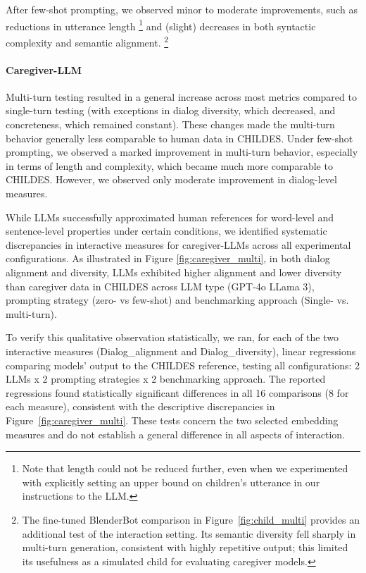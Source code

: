 After few-shot prompting, we observed minor to moderate improvements, such as reductions in utterance length \footnote{Note that length could not be reduced further, even when we experimented with explicitly setting an upper bound on children's utterance in our instructions to the LLM.} and (slight) decreases in both syntactic complexity and semantic alignment. \footnote{The fine-tuned BlenderBot comparison in Figure~\ref{fig:child_multi} provides an additional test of the interaction setting. Its semantic diversity fell sharply in multi-turn generation, consistent with highly repetitive output; this limited its usefulness as a simulated child for evaluating caregiver models.}


\paragraph{Caregiver-LLM} Multi-turn testing resulted in a general increase across most metrics compared to single-turn testing (with exceptions in dialog diversity, which decreased, and concreteness, which remained constant). These changes made the multi-turn behavior generally less comparable to human data in CHILDES. Under few-shot prompting, we observed a marked improvement in multi-turn behavior, especially in terms of length and complexity, which became much more comparable to CHILDES. However, we observed only moderate improvement in dialog-level measures.


While LLMs successfully approximated human references for word-level and sentence-level properties under certain conditions, we identified systematic discrepancies in interactive measures for caregiver-LLMs across all experimental configurations. As illustrated in Figure \ref{fig:caregiver_multi}, in both dialog alignment and diversity, LLMs exhibited higher alignment and lower diversity than caregiver data in CHILDES across LLM type (GPT-4o  LLama 3), prompting strategy (zero- vs few-shot) and benchmarking approach (Single- vs. multi-turn). 


To verify this qualitative observation statistically, we ran, for each of the two interactive measures (Dialog\_alignment and Dialog\_diversity), linear regressions comparing models' output to the CHILDES reference, testing all configurations: 2 LLMs x 2 prompting strategies x 2 benchmarking approach. The reported regressions found statistically significant differences in all 16 comparisons (8 for each measure), consistent with the descriptive discrepancies in Figure~\ref{fig:caregiver_multi}. These tests concern the two selected embedding measures and do not establish a general difference in all aspects of interaction.


